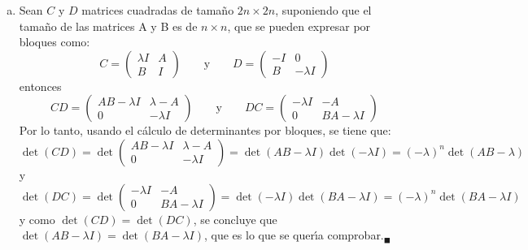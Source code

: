 \begin{solucion}
\begin{enumerate}[a)]
  \item Sean $C$ y $D$ matrices cuadradas de tama\~no $2n\times 2n$, suponiendo que el tama\~no de las matrices A y B es de $n\times n$, que se pueden expresar por bloques como:
  \begin{equation*}
   C = 
   \begin{pmatrix}
    \lambda I & A \\
    B         & I
   \end{pmatrix}
   \qquad \text{y} \qquad 
   D = 
   \begin{pmatrix}
    -I & 0 \\ 
     B & -\lambda I
   \end{pmatrix}
  \end{equation*}
  entonces
  \begin{equation*}
   CD = 
   \begin{pmatrix}
    AB-\lambda I & \lambda -A \\
    0            & -\lambda I
   \end{pmatrix}
   \qquad \text{y} \qquad 
   DC = 
   \begin{pmatrix}
    -\lambda I & -A \\
    0          & BA - \lambda I
   \end{pmatrix}
  \end{equation*}
  Por lo tanto, usando el c\'alculo de determinantes por bloques, se tiene que:
  \begin{equation*}
   \det (CD) = \det
   \begin{pmatrix}
    AB-\lambda I & \lambda -A \\
    0                    & -\lambda I
   \end{pmatrix}
   = \det(AB-\lambda I)\det(-\lambda I) = (-\lambda)^n \det (AB - \lambda)
  \end{equation*}
  y 
  \begin{equation*}
   \det(DC) = \det
   \begin{pmatrix}
    -\lambda I & -A \\
    0          & BA - \lambda I
   \end{pmatrix}
   = \det(- \lambda I) \det(BA - \lambda I) = (-\lambda)^n \det(BA - \lambda I)
  \end{equation*}
  y como $\det (CD) = \det (DC)$, se concluye que $\det(AB - \lambda I) = \det (BA - \lambda I)$, que es lo que se quer\'{\i}a comprobar.${}_{\blacksquare}$




 \end{enumerate}
\end{solucion}


